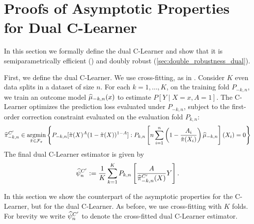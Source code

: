 \section{Proofs of Asymptotic Properties for Dual C-Learner}
\label{sec:proofs_dual}
In this section we formally define the dual C-Learner and show that it is semiparametrically efficient () and doubly robust (\cref{sec:double_robustness_dual}).

First, we define the dual C-Learner. We use cross-fitting, as in . 
Consider $K$ even data splits in a dataset of size $n$. 
For each $k=1,\ldots,K$, on the training fold $P_{-k, n}$, we train an outcome model $\widehat{\mu}_{-k,n}(x)$ to estimate $P[Y\mid X=x, A=1]$. The C-Learner optimizes the prediction loss evaluated under $P_{-k, n}$,  subject to the first-order correction constraint evaluated on the evaluation fold $P_{k, n}$:
\begin{align}
\label{eq:constraint_dual}
\widehat{\pi}^{C'}_{-k,n}\in \mathop{\rm argmin}_{\tilde \pi\in \mathcal F_\pi} \left\{
P_{-k,n}[ \tilde \pi(X)^A (1-\tilde \pi(X))^{1-A}] : 
P_{k,n}\left[ {n}\sum_{i=1}^n \left(1-\frac{A_i}{\tilde \pi(X_i)}\right) \widehat{\mu}_{-k,n}\right](X_i)=0
    \right\}
\end{align}
The final dual C-Learner estimator is given by
\begin{align}
    \widehat{\psi}^{C'}_n :=\frac{1}{K}\sum_{k=1}^K P_{k,n}\left[\frac{A}{\widehat{\pi}_{-k,n}^{C'}(X)}Y\right].
\label{eq:c_learner_def_dual}
\end{align}





In this section we show the counterpart of the asymptotic properties for the C-Learner, but for the dual C-Learner. 
As before, we use cross-fitting with $K$ folds. For brevity we write $\widehat{\psi}^{C'}_n$ to denote the cross-fitted dual C-Learner estimator. 
